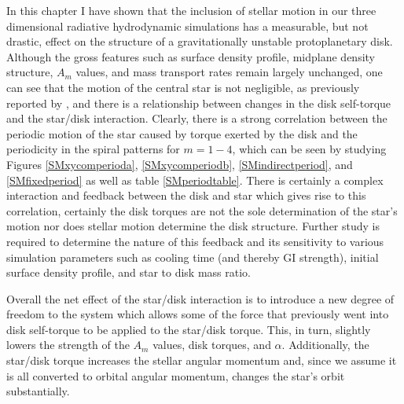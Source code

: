 In this chapter I have shown that the inclusion of stellar motion in our three dimensional radiative hydrodynamic simulations has a measurable, but not drastic, effect on the structure of a gravitationally unstable protoplanetary disk. Although the gross features such as surface density profile, midplane density structure, $A_m$ values, and mass transport rates remain largely unchanged, one can see that the motion of the central star is not negligible, as previously reported by \citet{rice2003a}, and there is a relationship between changes in the disk self-torque and the star/disk interaction. 
Clearly, there is a strong correlation between the periodic motion of the star caused by torque exerted by the disk and the periodicity in the spiral patterns for $m = 1-4$, which can be seen by studying Figures \ref{SMxycomperioda}, \ref{SMxycomperiodb}, \ref{SMindirectperiod}, and \ref{SMfixedperiod} as well as table \ref{SMperiodtable}. There is certainly a complex interaction  and feedback between the disk and star which gives rise to this correlation, certainly the disk torques are not the sole determination of the star's motion  nor does stellar motion determine the disk structure. Further study is required to determine the nature of this feedback and its sensitivity to various simulation parameters such as cooling time (and thereby GI strength), initial surface density profile, and star to disk mass ratio.

Overall the net effect of the star/disk interaction is to introduce a new degree of freedom to the system which allows some of the force that previously went into disk self-torque to be applied to the star/disk torque. This, in turn, slightly lowers the strength of the $A_m$ values, disk torques, and $\alpha$. Additionally, the star/disk torque increases the stellar angular momentum and, since we assume it is all converted to orbital angular momentum, changes the star's orbit substantially. 

 



